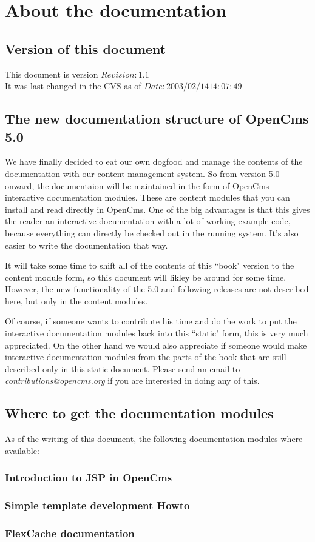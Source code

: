 \chapter{About the documentation}

\section{Version of this document}

This document is version $Revision: 1.1 $ \\
It was last changed in the CVS as of $Date: 2003/02/14 14:07:49 $ \\

\section{The new documentation structure of OpenCms 5.0}

We have finally decided to eat our own dogfood and manage the contents of the documentation 
with our content management system.
So from version 5.0 onward, the documentaion will be maintained in the form of OpenCms 
interactive documentation modules.
These are content modules that you can install and read directly in OpenCms.
One of the big advantages is that this gives the reader an interactive documentation 
with a lot of working example code,
because everything can directly be checked out in the running system.
It's also easier to write the documentation that way.

It will take some time to shift all of the contents of this ``book" version to 
the content module form, so this document will likley be around for some time.
However, the new functionality of the 5.0 and following releases are not described here,
but only in the content modules.

Of course, if someone wants to contribute his time and do the work to 
put the interactive documentation modules back into this ``static" form, this is very much appreciated. 
On the other hand we would also appreciate if someone would make interactive documentation modules
from the parts of the book that are still described only in this static document.
Please send an email to {\em contributions@opencms.org} if you are interested in doing any of this.

\section{Where to get the documentation modules}

As of the writing of this document, the following documentation modules where available:

\subsection{Introduction to JSP in OpenCms}

\subsection{Simple template development Howto}

\subsection{FlexCache documentation}


